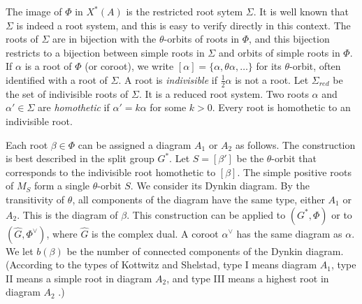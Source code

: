The image of $\Phi$ in $X^*(A)$ is the restricted root sytem $\Sigma$.  
It is well known that $\Sigma$ is indeed a root system, and this is easy to
verify directly in this context.
The roots of $\Sigma$ are in bijection with the 
$\theta$-orbits of  roots in $\Phi$, and this bijection restricts to a bijection between
simple roots in $\Sigma$ and
 orbits of simple
roots in $\Phi$.
If $\alpha$ is a root of $\Phi$ (or coroot), we write 
$[\alpha]=\{\alpha,\theta\alpha,\ldots\}$ for its
$\theta$-orbit, often identified with a root of $\Sigma$.
A root is {\it indivisible} if $\frac12\alpha$ is not a root.
Let $\Sigma_{red}$ be the set of %
indivisible roots of $\Sigma$.
It is a reduced root system.
Two roots $\alpha$ and $\alpha'\in\Sigma$ are {\it homothetic} if $\alpha' = k\alpha$ for some $k>0$.
Every root is homothetic to an indivisible root.  %


Each root $\beta\in\Phi$
can be assigned a diagram  $A_1$ or $A_2$ as follows.  
The construction is best described in the split group $G^*$.
Let $S=[\beta']$ be the $\theta$-orbit that corresponds to the indivisible
root homothetic to $[\beta]$.  
The simple
positive roots of $M_S$ form a single $\theta$-orbit $S$.  We consider
its Dynkin diagram.
By the transitivity of $\theta$,  all components of the diagram have the same type,
either  $A_1$
or $A_2$.  This is the diagram  of $\beta$.
This construction can be applied to $(G^*,\Phi)$ or to $(\hat G,\Phi^\vee)$, where $\hat G$
is the complex dual.
A coroot $\alpha^\vee$ has the same diagram  as $\alpha$.
We let $b(\beta)$ be the number of connected components of the Dynkin diagram.
(According to the types of Kottwitz and Shelstad, type I means diagram $A_1$, type II means
a simple root in diagram $A_2$, and type III means a highest root in diagram $A_2$ 
\cite{kottwitz1999foundations}.)






